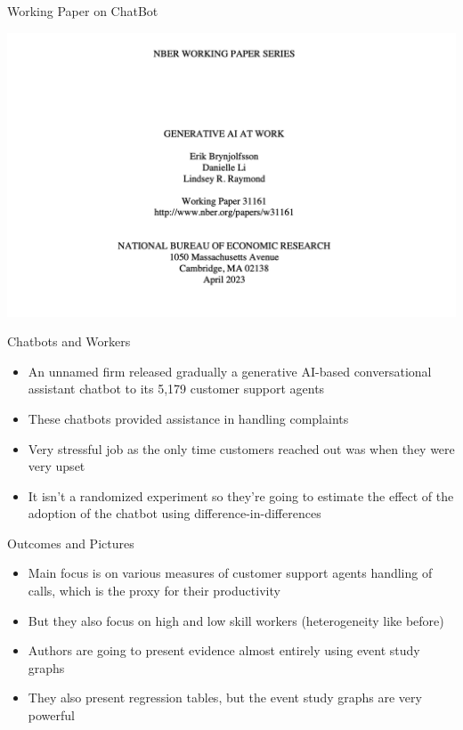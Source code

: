 \documentclass{beamer}
\begin{document}
\begin{frame}{Working Paper on ChatBot}
\begin{center}
\includegraphics[scale=0.35]{./lecture_includes/brynn}
\end{center}
\end{frame}



\begin{frame}{Chatbots and Workers}

\begin{itemize}

\item An unnamed firm released gradually a generative AI-based conversational assistant chatbot to its  5,179 customer support agents 
\item These chatbots provided assistance in handling complaints
\item Very stressful job as the only time customers reached out was when they were very upset
\item It isn't a randomized experiment so they're going to estimate the effect of the adoption of the chatbot using difference-in-differences

\end{itemize}

\end{frame}

\begin{frame}{Outcomes and Pictures}

\begin{itemize}

\item Main focus is on various measures of customer support agents handling of calls, which is the proxy for their productivity
\item But they also focus on high and low skill workers (heterogeneity like before)
\item Authors are going to present evidence almost entirely using event study graphs
\item They also present regression tables, but the event study graphs are very powerful

\end{itemize}

\end{frame}
\end{document}
